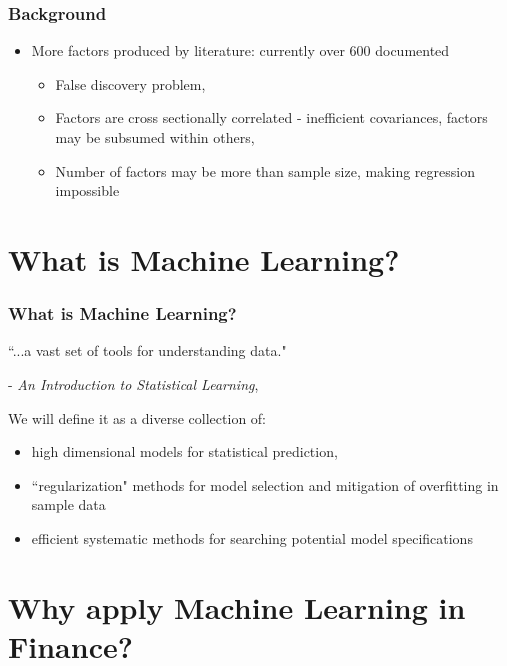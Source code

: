 \documentclass[]{beamer}
\begin{document}
\begin{frame}
\frametitle{Background}
\begin{itemize}
\item More factors produced by literature: currently over 600 documented \citep{harvey_census_2019}

\begin{itemize}
	\item False discovery problem, \citep{harvey__2016}
	
	\item Factors are cross sectionally correlated - inefficient covariances, factors may be subsumed within others, \citep{feng_taming_2019}
	
	\item Number of factors may be more than sample size, making regression impossible
\end{itemize}


\end{itemize}
\end{frame}

\section{What is Machine Learning?}

\begin{frame}
\frametitle{What is Machine Learning?}
``...a vast set of tools for understanding data."

- \textit{An Introduction to Statistical Learning}, \citep{hastie_elements_2009}

We will define it as a diverse collection of:
\begin{itemize}
	\item high dimensional models for statistical prediction,
	\item ``regularization" methods for model selection and mitigation of overfitting in sample data
	\item efficient systematic methods for searching potential model specifications
\end{itemize}
\end{frame}

\section{Why apply Machine Learning in Finance?}
\end{document}
